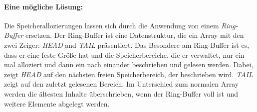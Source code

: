 \paragraph*{Eine mögliche Lösung:}
Die Speicherallozierungen lassen sich durch die Anwendung von einem \emph{Ring-Buffer}
ersetzen. Der Ring-Buffer ist eine Datenstruktur, die ein Array mit den zwei
Zeiger: \emph{HEAD} and \emph{TAIL} präsentiert. Das Besondere am Ring-Buffer
ist es, dass er eine feste Größe hat und die Speicherbereiche, die er verwaltet,
nur ein mal alloziert und dann ein nach einander beschrieben und gelesen
werden. Dabei, zeigt \emph{HEAD} auf den nächsten freien Speicherbereich, der
beschrieben wird. \emph{TAIL} zeigt auf den zuletzt gelesenen Bereich. Im
Unterschied zum normalen Array werden die ältesten Inhalte überschrieben, wenn
der Ring-Buffer voll ist und weitere Elemente abgelegt werden.
%
